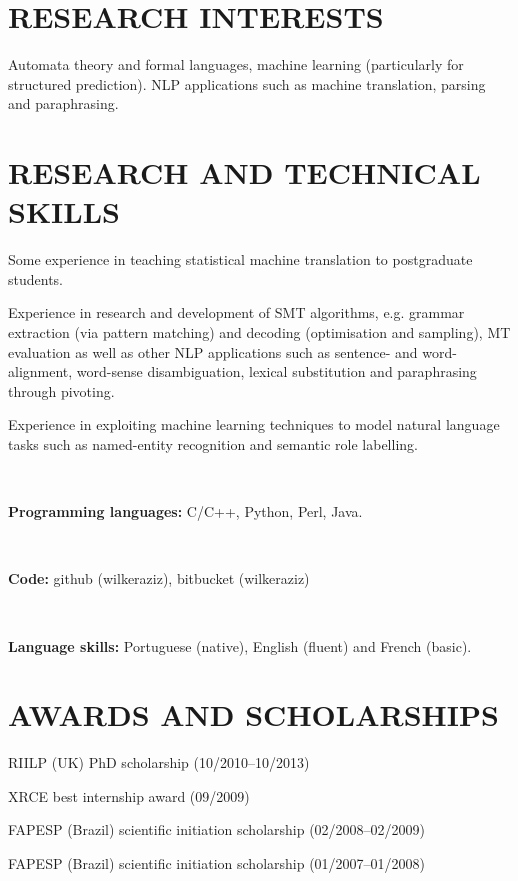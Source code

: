 \section*{RESEARCH INTERESTS}

Automata theory and formal languages, machine learning (particularly for structured prediction). NLP applications such as machine translation, parsing and paraphrasing.

\section*{RESEARCH AND TECHNICAL SKILLS}

Some experience in teaching statistical machine translation to postgraduate students.

Experience in research and development of SMT algorithms, e.g. grammar extraction (via pattern matching) and decoding (optimisation and sampling), MT evaluation as well as other NLP applications such as sentence- and word-alignment, word-sense disambiguation, lexical substitution and paraphrasing through pivoting. 

Experience in exploiting machine learning techniques to model natural language tasks such as named-entity recognition and semantic role labelling.

~

{\bf Programming languages:} C/C++, Python, Perl, Java.

~

{\bf Code:} github (wilkeraziz), bitbucket (wilkeraziz)

~

{\bf Language skills:} Portuguese (native), English (fluent) and French (basic).

\section*{AWARDS AND SCHOLARSHIPS}
\begin{description}
	\item RIILP (UK) PhD scholarship (10/2010--10/2013)
	\item XRCE best internship award (09/2009)
	\item FAPESP (Brazil) scientific initiation scholarship (02/2008--02/2009)
	\item FAPESP (Brazil) scientific initiation scholarship (01/2007--01/2008)
\end{description}
